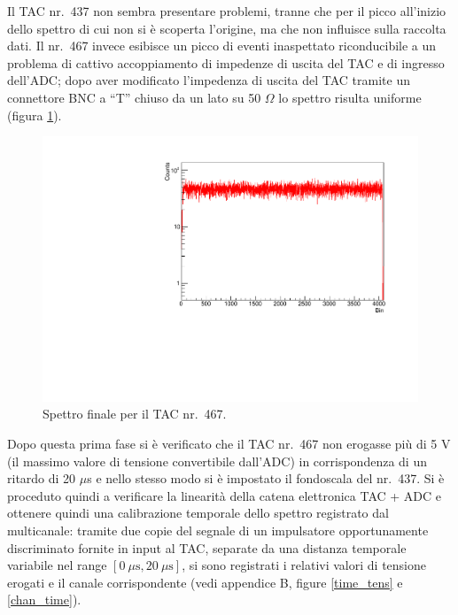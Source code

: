 \documentclass[11pt, oneside, a4paper]{article}   	%
\begin{document}
Il TAC nr.~437 non sembra presentare problemi, tranne che per il picco all'inizio dello spettro di cui non si è scoperta l'origine, ma che non influisce sulla raccolta dati. Il nr.~467 invece esibisce un picco di eventi inaspettato riconducibile a un problema di cattivo accoppiamento di impedenze di uscita del TAC e di ingresso dell'ADC; dopo aver modificato l'impedenza di uscita del TAC tramite un connettore BNC a ``T'' chiuso da un lato su 50 $\Omega$ lo spettro risulta uniforme (figura \ref{rumore2}).

%
\begin{figure}[]
	\centering
	\includegraphics[scale=0.45]{img/bkg_dx2.pdf}
	\caption{Spettro finale per il TAC nr.~467.}
	\label{rumore2}
\end{figure}
%
Dopo questa prima fase si è verificato che il TAC nr.~467 non erogasse più di 5 V (il massimo valore di tensione convertibile dall'ADC) in corrispondenza di un ritardo di 20 $\mu$s e nello stesso modo si è impostato il fondoscala del nr.~437. Si è proceduto quindi a verificare la linearità della catena elettronica TAC + ADC e ottenere quindi una calibrazione temporale dello spettro registrato dal multicanale: tramite due copie del segnale di un impulsatore opportunamente discriminato fornite in input al TAC, separate da una distanza temporale variabile nel range $[0 \ \mu \mbox{s},20 \ \mu \mbox{s}]$, si sono registrati i relativi valori di tensione erogati e il canale corrispondente (vedi appendice B, figure \ref{time_tens} e \ref{chan_time}).
%
%
\end{document}
